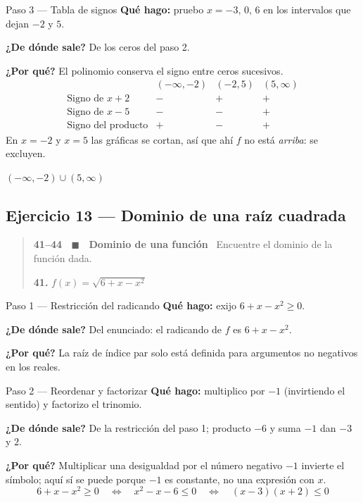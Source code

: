 \documentclass[11pt]{article}
\begin{document}
\begin{paso}{Paso 3 --- Tabla de signos}
\textbf{Qué hago:} pruebo $x=-3,\,0,\,6$ en los intervalos que dejan $-2$ y $5$.

\textbf{¿De dónde sale?} De los ceros del paso 2.

\textbf{¿Por qué?} El polinomio conserva el signo entre ceros sucesivos.
\[
\begin{array}{l|ccc}
 & (-\infty,-2) & (-2,5) & (5,\infty)\\\hline
\text{Signo de } x+2 & - & + & +\\
\text{Signo de } x-5 & - & - & +\\\hline
\text{Signo del producto} & + & - & +
\end{array}
\]
En $x=-2$ y $x=5$ las gráficas se cortan, así que ahí $f$ no está \emph{arriba}: se excluyen.
\end{paso}

\begin{resp}
$(-\infty,-2)\cup(5,\infty)$
\end{resp}

\subsection*{Ejercicio 13 — Dominio de una raíz cuadrada}

\begin{quote}
\textbf{41--44 \ $\blacksquare$ \ Dominio de una función} \ Encuentre el dominio de la función dada.

\textbf{41.} $f(x)=\sqrt{6+x-x^2}$
\end{quote}

\begin{paso}{Paso 1 --- Restricción del radicando}
\textbf{Qué hago:} exijo $6+x-x^2\ge 0$.

\textbf{¿De dónde sale?} Del enunciado: el radicando de $f$ es $6+x-x^2$.

\textbf{¿Por qué?} La raíz de índice par solo está definida para argumentos no negativos en los reales.
\end{paso}

\begin{paso}{Paso 2 --- Reordenar y factorizar}
\textbf{Qué hago:} multiplico por $-1$ (invirtiendo el sentido) y factorizo el trinomio.

\textbf{¿De dónde sale?} De la restricción del paso 1; producto $-6$ y suma $-1$ dan $-3$ y $2$.

\textbf{¿Por qué?} Multiplicar una desigualdad por el número negativo $-1$ invierte el símbolo; aquí sí se puede porque $-1$ es constante, no una expresión con $x$.
\[
6+x-x^2\ge 0
\quad\Longleftrightarrow\quad
x^2-x-6\le 0
\quad\Longleftrightarrow\quad
(x-3)(x+2)\le 0
\]
\end{paso}
\end{document}
